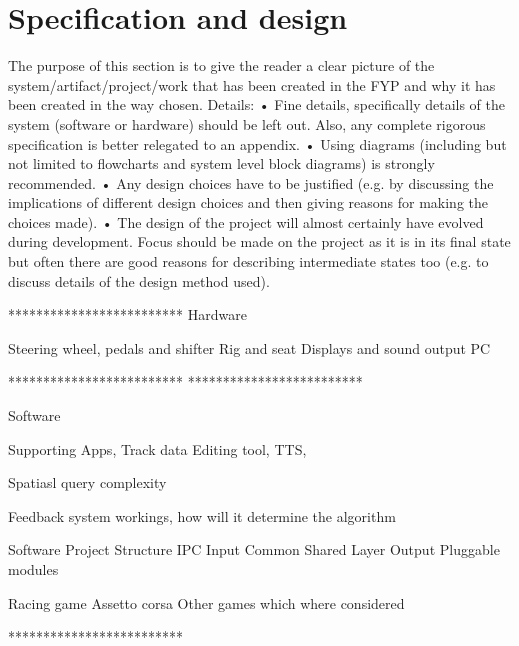 \section{Specification and design}

The purpose of this section is to give the reader a clear picture of the system/artifact/project/work that has been created in the FYP and why it has been created in the way chosen. 
Details:
• Fine details, specifically details of the system (software or hardware) should be left out. Also, any complete rigorous specification is better relegated to an appendix.
• Using diagrams (including but not limited to flowcharts and system level block diagrams) is strongly recommended.
• Any design choices have to be justified (e.g. by discussing the implications of different design choices and then giving reasons for making the choices made).
• The design of the project will almost certainly have evolved during development. Focus should be made on the project as it is in its final state but often there are good reasons for describing intermediate states too (e.g. to discuss details of the design method used). 

*************************
Hardware

Steering wheel, pedals and shifter
Rig and seat
Displays and sound output
PC

*************************
*************************

Software

Supporting Apps, Track data Editing tool, TTS, 

Spatiasl query complexity

Feedback system workings, how will it determine the algorithm 

Software Project Structure
	IPC
	Input
	Common Shared Layer
	Output
	Pluggable modules


Racing game
	Assetto corsa
	Other games which where considered

*************************